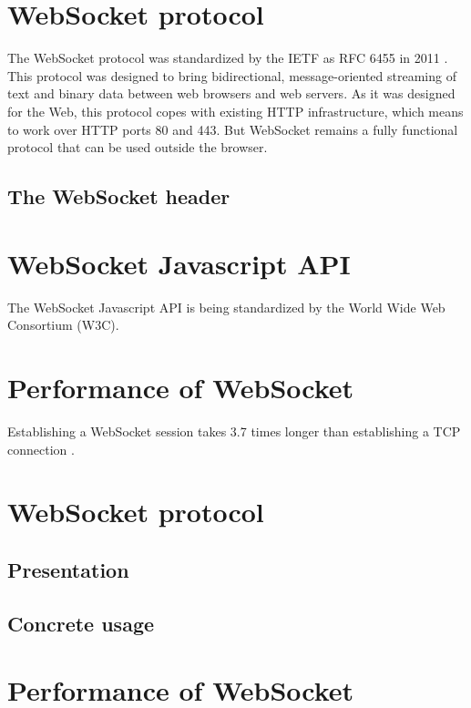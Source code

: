 \documentclass[journal,compsoc]{IEEEtran}
\newcommand{\ws}{WebSocket}
\begin{document}
\section{\ws{} protocol}
The \ws{} protocol was standardized by the IETF as RFC 6455 in 2011 \cite{rfc6455}.
This protocol was designed to bring bidirectional, message-oriented streaming of text and binary data between web browsers and web servers.
As it was designed for the Web, this protocol copes with existing HTTP infrastructure, which means to work over HTTP ports 80 and 443.
But \ws{} remains a fully functional protocol that can be used outside the browser.

\subsection{The \ws{} header}




\section{\ws{} Javascript API}
The \ws{} Javascript API is being standardized by the World Wide Web Consortium (W3C).


\section{Performance of WebSocket}

Establishing a \ws{} session takes 3.7 times longer than establishing a TCP connection \cite{performanceEvaluationOfWebsocketProtocol}.


\section{\ws{} protocol}

\subsection{Presentation}

\subsection{Concrete usage}



\section{Performance of \ws}
\end{document}
